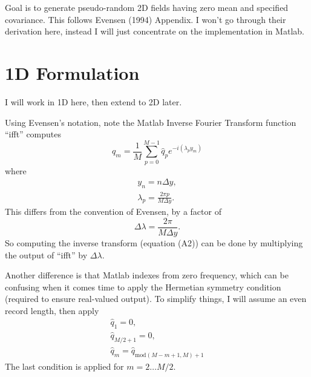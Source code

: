 \documentclass{article}
\begin{document}
Goal is to generate pseudo-random 2D fields having zero mean and
specified covariance.  This follows Evensen (1994) Appendix.  I won't
go through their derivation here, instead I will just concentrate on
the implementation in Matlab.

\section{1D Formulation}

I will work in 1D here, then extend to 2D later.

Using Evensen's notation, note the Matlab Inverse Fourier Transform
function ``ifft'' computes
\begin{equation}
  q_m = \frac{1}{M}\sum_{p=0}^{M-1}
  \hat{q}_p e^{-i\left(\lambda_p y_m\right)}
\end{equation}
where
\begin{eqnarray}
  y_n = n\Delta y,\\
  \lambda_p = \frac{2\pi p}{M\Delta y}.
\end{eqnarray}
This differs from the convention of Evensen, by a factor of
\begin{equation}
  \Delta\lambda = \frac{2\pi}{M\Delta y}.
\end{equation}
So computing the inverse transform (equation (A2)) can be done by
multiplying the output of ``ifft'' by $\Delta\lambda$.

Another difference is that Matlab indexes from zero frequency, which
can be confusing when it comes time to apply the Hermetian symmetry
condition (required to ensure real-valued output).  To simplify
things, I will assume an even record length, then apply
\begin{eqnarray}
  \hat{q}_1=0,\\
  \hat{q}_{M/2+1}=0,\\
  \hat{q}_m = \hat{q}_{\textrm{mod}(M-m+1,M)+1}
\end{eqnarray}
The last condition is applied for $m=2\dots M/2$.
\end{document}
